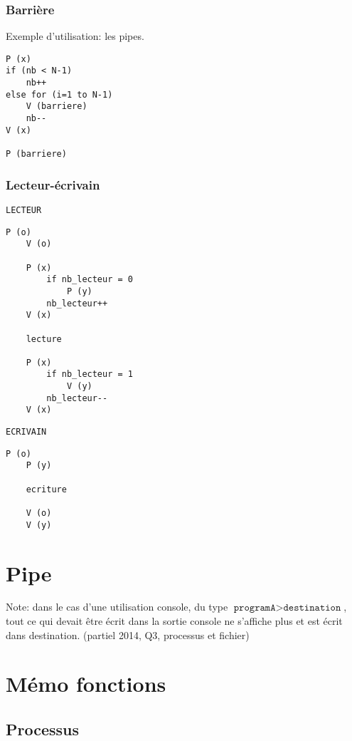 \documentclass[10pt,twocolumn,a4paper]{article}
\begin{document}
\subsubsection{Barrière}

Exemple d'utilisation: les pipes.

\begin{lstlisting}[xleftmargin=1cm,frame=shadowbox]
P (x)
if (nb < N-1)
    nb++
else for (i=1 to N-1) 
    V (barriere)
    nb--
V (x)

P (barriere)
\end{lstlisting}

\subsubsection{Lecteur-\'ecrivain}

\texttt{LECTEUR}
\begin{lstlisting}[frame=shadowbox,xrightmargin=1cm]
    P (o)
    V (o)

    P (x)
        if nb_lecteur = 0
            P (y)
        nb_lecteur++
    V (x)

    lecture

    P (x)
        if nb_lecteur = 1
            V (y)
        nb_lecteur--
    V (x)
\end{lstlisting}

\texttt{ECRIVAIN}
\begin{lstlisting}[frame=shadowbox,xrightmargin=1cm]
    P (o)
    P (y)

    ecriture

    V (o)
    V (y)
\end{lstlisting}

\section{Pipe}

Note: dans le cas d'une utilisation console, du type $\texttt{programA} > \texttt{destination}$, tout ce qui devait être écrit dans la sortie console ne s'affiche plus et est écrit dans destination. (partiel 2014, Q3, processus et fichier)


\section{Mémo fonctions}

\subsection{Processus}
\end{document}
